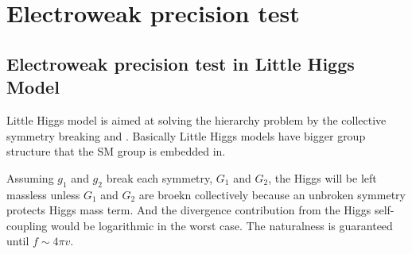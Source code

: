 \chapter{Electroweak precision test}
\label{chap:EWPT}



\section{Electroweak precision test in Little Higgs Model}
Little Higgs model is aimed at solving the hierarchy problem by the collective symmetry breaking
 and \cite{Callan:1969sn}.
Basically Little Higgs models have bigger group structure that the SM group is embedded in. 


Assuming $g_1$ and $g_2$ break each symmetry, $G_1$ and $G_2$, 
the Higgs will be left massless unless $G_1$ and $G_2$ are broekn collectively
because an unbroken symmetry protects Higgs mass term.
And the divergence contribution from the Higgs self-coupling would be logarithmic in the worst case.
The naturalness is guaranteed until $f \sim 4\pi v$. 
